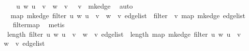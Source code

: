 \begin{isabellebody}
%
\isadelimproof
%
\endisadelimproof
%
\isatagproof
{}\isamarkupfalse%
{\isacharminus}{\kern0pt}\isanewline
\ \ \isamarkupfalse%
\ {\isachardoublequoteopen}{\isacharparenleft}{\kern0pt}{\isasymlambda}{\isacharparenleft}{\kern0pt}u{\isacharcomma}{\kern0pt}\ w{\isacharparenright}{\kern0pt}{\isachardot}{\kern0pt}\ u\ {\isacharequal}{\kern0pt}\ v\ {\isasymor}\ w\ {\isacharequal}{\kern0pt}\ v{\isacharparenright}{\kern0pt}\ {\isacharequal}{\kern0pt}\ {\isacharparenleft}{\kern0pt}{\isasymin}{\isacharparenright}{\kern0pt}\ v\ {\isasymcirc}\ mk{\isacharunderscore}{\kern0pt}edge{\isachardoublequoteclose}\ \isamarkupfalse%
\ auto\isanewline
\ \ \isamarkupfalse%
\ \isamarkupfalse%
\ {}{\isacharcolon}{\kern0pt}\ {\isachardoublequoteopen}map\ mk{\isacharunderscore}{\kern0pt}edge\ {\isacharparenleft}{\kern0pt}filter\ {\isacharparenleft}{\kern0pt}{\isasymlambda}{\isacharparenleft}{\kern0pt}u{\isacharcomma}{\kern0pt}\ w{\isacharparenright}{\kern0pt}{\isachardot}{\kern0pt}\ u\ {\isacharequal}{\kern0pt}\ v\ {\isasymor}\ w\ {\isacharequal}{\kern0pt}\ v{\isacharparenright}{\kern0pt}\ edge{\isacharunderscore}{\kern0pt}list{\isacharparenright}{\kern0pt}\ {\isacharequal}{\kern0pt}\ filter\ {\isacharparenleft}{\kern0pt}{\isacharparenleft}{\kern0pt}{\isasymin}{\isacharparenright}{\kern0pt}\ v{\isacharparenright}{\kern0pt}\ {\isacharparenleft}{\kern0pt}map\ mk{\isacharunderscore}{\kern0pt}edge\ edge{\isacharunderscore}{\kern0pt}list{\isacharparenright}{\kern0pt}{\isachardoublequoteclose}\ \isamarkupfalse%
\ filter{\isacharunderscore}{\kern0pt}map\ \isamarkupfalse%
\ metis\isanewline
\ \ \isamarkupfalse%
\ {\isachardoublequoteopen}length\ {\isacharparenleft}{\kern0pt}filter\ {\isacharparenleft}{\kern0pt}{\isasymlambda}{\isacharparenleft}{\kern0pt}u{\isacharcomma}{\kern0pt}\ w{\isacharparenright}{\kern0pt}{\isachardot}{\kern0pt}\ u\ {\isacharequal}{\kern0pt}\ v\ {\isasymor}\ w\ {\isacharequal}{\kern0pt}\ v{\isacharparenright}{\kern0pt}\ edge{\isacharunderscore}{\kern0pt}list{\isacharparenright}{\kern0pt}\ {\isacharequal}{\kern0pt}\ length\ {\isacharparenleft}{\kern0pt}map\ mk{\isacharunderscore}{\kern0pt}edge\ {\isacharparenleft}{\kern0pt}filter\ {\isacharparenleft}{\kern0pt}{\isasymlambda}{\isacharparenleft}{\kern0pt}u{\isacharcomma}{\kern0pt}\ w{\isacharparenright}{\kern0pt}{\isachardot}{\kern0pt}\ u\ {\isacharequal}{\kern0pt}\ v\ {\isasymor}\ w\ {\isacharequal}{\kern0pt}\ v{\isacharparenright}{\kern0pt}\ edge{\isacharunderscore}{\kern0pt}list{\isacharparenright}{\kern0pt}{\isacharparenright}{\kern0pt}{\isachardoublequoteclose}\ \isamarkupfalse%

\end{isabellebody}
